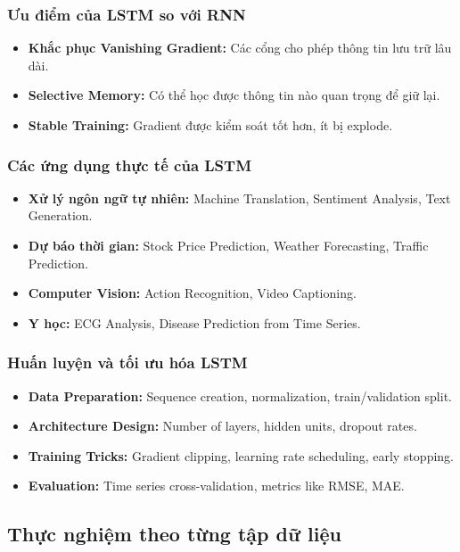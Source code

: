 \subsubsection{Ưu điểm của LSTM so với RNN}
\begin{itemize}
    \item \textbf{Khắc phục Vanishing Gradient:} Các cổng cho phép thông tin lưu trữ lâu dài.
    \item \textbf{Selective Memory:} Có thể học được thông tin nào quan trọng để giữ lại.
    \item \textbf{Stable Training:} Gradient được kiểm soát tốt hơn, ít bị explode.
\end{itemize}

\subsubsection{Các ứng dụng thực tế của LSTM}
\begin{itemize}
    \item \textbf{Xử lý ngôn ngữ tự nhiên:} Machine Translation, Sentiment Analysis, Text Generation.
    \item \textbf{Dự báo thời gian:} Stock Price Prediction, Weather Forecasting, Traffic Prediction.
    \item \textbf{Computer Vision:} Action Recognition, Video Captioning.
    \item \textbf{Y học:} ECG Analysis, Disease Prediction from Time Series.
\end{itemize}

\subsubsection{Huấn luyện và tối ưu hóa LSTM}
\begin{itemize}
    \item \textbf{Data Preparation:} Sequence creation, normalization, train/validation split.
    \item \textbf{Architecture Design:} Number of layers, hidden units, dropout rates.
    \item \textbf{Training Tricks:} Gradient clipping, learning rate scheduling, early stopping.
    \item \textbf{Evaluation:} Time series cross-validation, metrics like RMSE, MAE.
\end{itemize}

\subsection{Thực nghiệm theo từng tập dữ liệu}

